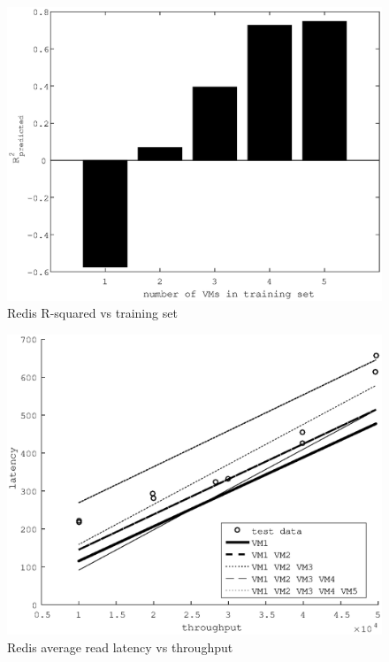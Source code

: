 \documentclass{acm_proc_article-sp}
\begin{document}
\begin{figure}
\centering
\includegraphics[scale = 0.5]{redis_write_bar.eps}
\caption{Redis R-squared vs training set}
\label{figure:redisbarwrite}
\end{figure}

\begin{figure}
\centering
\includegraphics[scale = 0.5]{redis_read_plot.eps}
\caption{Redis average read latency vs throughput}
\label{figure:redisread}
\end{figure}
\end{document}
